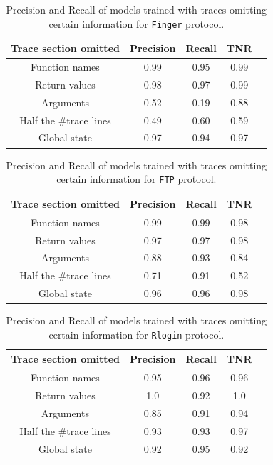 \begin{table}[]
\centering
\begin{tabular}{|c|c|c|c|c|}
	\hline
	Trace section omitted   & {Precision} & {Recall} & TNR\\ 
	\hline \hline
	Function names  & 0.99 & 0.95 & 0.99 \\ \hline 
	Return values & 0.98 & 0.97 & 0.99 \\ \hline
	Arguments & 0.52  & 0.19 & 0.88 \\ \hline
	Half the \#trace lines & 0.49 & 0.60 & 0.59 \\ \hline
	Global state & 0.97 & 0.94 & 0.97 \\ \hline
\end{tabular}
\caption{Precision and Recall of models trained with traces omitting certain information for \texttt{Finger} protocol. }
\label{tab:finger_removed_trace}
\end{table}


\begin{table}[]
\centering
\begin{tabular}{|c|c|c|c|c|}
	\hline
	Trace section omitted   & {Precision} & {Recall} & TNR\\ 
	\hline \hline
	Function names  & 0.99 & 0.99 & 0.98 \\ \hline 
	Return values & 0.97 & 0.97 & 0.98 \\ \hline
	Arguments & 0.88  & 0.93 & 0.84 \\ \hline
	Half the \#trace lines & 0.71 & 0.91 & 0.52 \\ \hline
	Global state & 0.96 & 0.96 & 0.98 \\ \hline 
\end{tabular}
\caption{Precision and Recall of models trained with traces omitting certain information for \texttt{FTP} protocol. }
\label{tab:ftp_removed_trace}
\end{table}

\begin{table}[]
\centering
\begin{tabular}{|c|c|c|c|c|}
	\hline
	Trace section omitted   & {Precision} & {Recall} & TNR\\ 
	\hline \hline
	Function names  & 0.95 & 0.96 & 0.96 \\ \hline 
	Return values & 1.0 & 0.92 & 1.0 \\ \hline
	Arguments & 0.85  & 0.91 & 0.94 \\ \hline
	Half the \#trace lines & 0.93 & 0.93 & 0.97 \\ \hline
	Global state & 0.92 & 0.95 & 0.92 \\ \hline 
\end{tabular}
\caption{Precision and Recall of models trained with traces omitting certain information for \texttt{Rlogin} protocol. }
\label{tab:rlogin_removed_trace}
\end{table}

